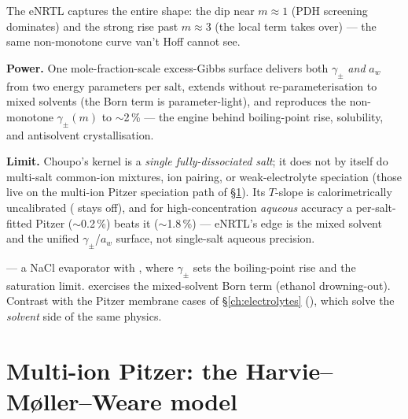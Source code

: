 \documentclass[11pt,a4paper]{article}
\begin{document}
The eNRTL captures the entire shape: the dip near $m\approx 1$ (PDH
screening dominates) and the strong rise past $m\approx 3$ (the local
term takes over) --- the same non-monotone curve van't Hoff cannot see.

\begin{keyidea}
\textbf{Power.}  One mole-fraction-scale excess-Gibbs surface delivers
both $\gamma_\pm$ \emph{and} $a_w$ from two energy parameters per salt,
extends without re-parameterisation to mixed solvents (the Born term is
parameter-light), and reproduces the non-monotone $\gamma_\pm(m)$ to
$\sim$2\,\% --- the engine behind boiling-point rise, solubility, and
antisolvent crystallisation.

\textbf{Limit.}  Choupo's kernel is a \emph{single fully-dissociated
salt}; it does not by itself do multi-salt common-ion mixtures, ion
pairing, or weak-electrolyte speciation (those live on the multi-ion
Pitzer speciation path of
\S\ref{ch:pitzer-hmw}).  Its $T$-slope is calorimetrically uncalibrated
( stays off), and for high-concentration
\emph{aqueous} accuracy a per-salt-fitted Pitzer ($\sim$0.2\,\%) beats
it ($\sim$1.8\,\%) --- eNRTL's edge is the mixed solvent and the unified
$\gamma_\pm$/$a_w$ surface, not single-salt aqueous precision.
\end{keyidea}

\begin{tutoriallink}
 --- a NaCl
evaporator with , where $\gamma_\pm$
sets the boiling-point rise and the saturation limit.
exercises the mixed-solvent Born term (ethanol drowning-out).  Contrast
with the Pitzer membrane cases of \S\ref{ch:electrolytes}
(), which solve the \emph{solvent} side of the
same physics.
\end{tutoriallink}

\section{Multi-ion Pitzer: the Harvie--M\o ller--Weare
model}\label{ch:pitzer-hmw}
\end{document}
